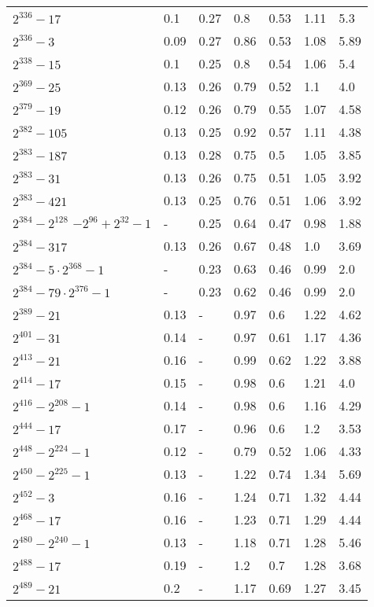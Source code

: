 \documentclass[conference,letterpaper]{IEEEtran}
\begin{document}
\begin{xtabular}{|l|p{0.475cm}|p{0.75cm}@{}|p{0.7cm}@{}|p{0.6cm}@{}|p{0.6cm}@{}|p{0.75cm}@{}|@{}}
	$2^{336}-17$ & 0.1 & 0.27 & 0.8 & 0.53 & 1.11 & 5.3 \\
	$2^{336}-3$ & 0.09 & 0.27 & 0.86 & 0.53 & 1.08 & 5.89 \\
	$2^{338}-15$ & 0.1 & 0.25 & 0.8 & 0.54 & 1.06 & 5.4 \\
	$2^{369}-25$ & 0.13 & 0.26 & 0.79 & 0.52 & 1.1 & 4.0 \\
	$2^{379}-19$ & 0.12 & 0.26 & 0.79 & 0.55 & 1.07 & 4.58 \\
	$2^{382}-105$ & 0.13 & 0.25 & 0.92 & 0.57 & 1.11 & 4.38 \\
	$2^{383}-187$ & 0.13 & 0.28 & 0.75 & 0.5 & 1.05 & 3.85 \\
	$2^{383}-31$ & 0.13 & 0.26 & 0.75 & 0.51 & 1.05 & 3.92 \\
	$2^{383}-421$ & 0.13 & 0.25 & 0.76 & 0.51 & 1.06 & 3.92 \\
	 & - & 0.25 & 0.64 & 0.47 & 0.98 & 1.88 \\
	$2^{384}-317$ & 0.13 & 0.26 & 0.67 & 0.48 & 1.0 & 3.69 \\
	$2^{384}-5\cdot 2^{368}-1$ & - & 0.23 & 0.63 & 0.46 & 0.99 & 2.0 \\
	$2^{384}-79\cdot 2^{376}-1$ & - & 0.23 & 0.62 & 0.46 & 0.99 & 2.0 \\
	$2^{389}-21$ & 0.13 & - & 0.97 & 0.6 & 1.22 & 4.62 \\
	$2^{401}-31$ & 0.14 & - & 0.97 & 0.61 & 1.17 & 4.36 \\
	$2^{413}-21$ & 0.16 & - & 0.99 & 0.62 & 1.22 & 3.88 \\
	$2^{414}-17$ & 0.15 & - & 0.98 & 0.6 & 1.21 & 4.0 \\
	$2^{416}-2^{208}-1$ & 0.14 & - & 0.98 & 0.6 & 1.16 & 4.29 \\
	$2^{444}-17$ & 0.17 & - & 0.96 & 0.6 & 1.2 & 3.53 \\
	$2^{448}-2^{224}-1$ & 0.12 & - & 0.79 & 0.52 & 1.06 & 4.33 \\
	$2^{450}-2^{225}-1$ & 0.13 & - & 1.22 & 0.74 & 1.34 & 5.69 \\
	$2^{452}-3$ & 0.16 & - & 1.24 & 0.71 & 1.32 & 4.44 \\
	$2^{468}-17$ & 0.16 & - & 1.23 & 0.71 & 1.29 & 4.44 \\
	$2^{480}-2^{240}-1$ & 0.13 & - & 1.18 & 0.71 & 1.28 & 5.46 \\
	$2^{488}-17$ & 0.19 & - & 1.2 & 0.7 & 1.28 & 3.68 \\
	$2^{489}-21$ & 0.2 & - & 1.17 & 0.69 & 1.27 & 3.45 \\

\end{xtabular}
\end{document}
